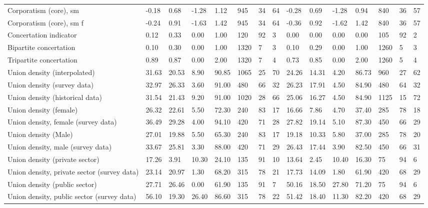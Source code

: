 \begin{longtable}{lllllllllllllll}
\addlinespace
Corporatism (core), sm & -0.18 & 0.68 & -1.28 & 1.12 & 945 & 34 & 64 & -0.28 & 0.69 & -1.28 & 0.94 & 840 & 36 & 57\\
Corporatism (core), sm f & -0.24 & 0.91 & -1.63 & 1.42 & 945 & 34 & 64 & -0.36 & 0.92 & -1.62 & 1.42 & 840 & 36 & 57\\
Concertation indicator & 0.12 & 0.33 & 0.00 & 1.00 & 120 & 92 & 3 & 0.00 & 0.00 & 0.00 & 0.00 & 105 & 92 & 2\\
Bipartite concertation & 0.10 & 0.30 & 0.00 & 1.00 & 1320 & 7 & 3 & 0.10 & 0.29 & 0.00 & 1.00 & 1260 & 5 & 3\\
Tripartite concertation & 0.89 & 0.87 & 0.00 & 2.00 & 1320 & 7 & 4 & 0.73 & 0.85 & 0.00 & 2.00 & 1260 & 5 & 4\\
\addlinespace
Union density (interpolated) & 31.63 & 20.53 & 8.90 & 90.85 & 1065 & 25 & 70 & 24.26 & 14.31 & 4.20 & 86.73 & 960 & 27 & 62\\
Union density (survey data) & 32.97 & 26.33 & 3.60 & 91.00 & 480 & 66 & 32 & 26.23 & 17.91 & 4.50 & 84.90 & 480 & 64 & 32\\
Union density (historical data) & 31.54 & 21.43 & 9.20 & 91.00 & 1020 & 28 & 66 & 25.06 & 16.27 & 4.50 & 84.90 & 1125 & 15 & 72\\
Union density (female) & 26.32 & 22.61 & 5.50 & 72.30 & 240 & 83 & 17 & 16.66 & 7.86 & 4.70 & 37.40 & 285 & 78 & 18\\
Union density, female (survey data) & 36.49 & 29.28 & 4.00 & 94.10 & 420 & 71 & 28 & 27.82 & 19.14 & 5.10 & 87.30 & 450 & 66 & 29\\
\addlinespace
Union density (Male) & 27.01 & 19.88 & 5.50 & 65.30 & 240 & 83 & 17 & 19.18 & 10.33 & 5.80 & 37.00 & 285 & 78 & 20\\
Union density, male (survey data) & 33.67 & 25.81 & 3.30 & 88.00 & 420 & 71 & 29 & 26.43 & 17.44 & 3.90 & 82.50 & 450 & 66 & 31\\
Union density (private sector) & 17.26 & 3.91 & 10.30 & 24.10 & 135 & 91 & 10 & 13.64 & 2.45 & 10.40 & 16.30 & 75 & 94 & 6\\
Union density, private sector (survey data) & 23.14 & 20.97 & 1.30 & 68.20 & 315 & 78 & 21 & 17.73 & 14.09 & 1.80 & 61.90 & 420 & 68 & 29\\
Union density (public sector) & 27.71 & 26.46 & 0.00 & 61.90 & 135 & 91 & 7 & 50.16 & 18.50 & 27.80 & 71.20 & 75 & 94 & 6\\
\addlinespace
Union density, public sector (survey data) & 56.10 & 19.30 & 26.40 & 86.60 & 315 & 78 & 22 & 51.42 & 18.40 & 11.30 & 82.20 & 420 & 68 & 29\\

\end{longtable}
